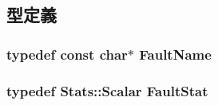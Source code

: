 \subsection{型定義}
\hypertarget{sim_2faults_8hh_abb196df64725e5c2568c900cf130d8d7}{
\subsubsection[{FaultName}]{\setlength{\rightskip}{0pt plus 5cm}typedef const char$\ast$ {\bf FaultName}}}
\label{sim_2faults_8hh_abb196df64725e5c2568c900cf130d8d7}
\hypertarget{sim_2faults_8hh_afd21824d6eba50d78a4785991e6d122e}{
\subsubsection[{FaultStat}]{\setlength{\rightskip}{0pt plus 5cm}typedef {\bf Stats::Scalar} {\bf FaultStat}}}
\label{sim_2faults_8hh_afd21824d6eba50d78a4785991e6d122e}

